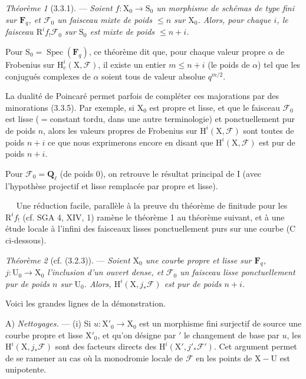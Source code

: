 \documentclass[11pt,leqno]{article}
\newcommand{\Page}[1]{\ifvmode\noindent\else\unskip\ \fi{\footnotesize\textcolor{gray}{[p.\,#1]}}\ \ignorespaces}
\begin{document}
\textit{Théorème 1} (3.3.1). — \textit{Soient \(f:\mathrm{X}_0\to\mathrm{S}_0\) un morphisme de schémas de type fini sur \(\mathbf{F}_q\), et \(\mathscr{F}_0\) un faisceau mixte de poids \(\leq n\) sur \(\mathrm{X}_0\). Alors, pour chaque \(i\), le faisceau \(\mathrm{R}^i f_!\mathscr{F}_0\) sur \(\mathrm{S}_0\) est mixte de poids \(\leq n+i\).}

Pour \(\mathrm{S}_0=\operatorname{Spec}(\mathbf{F}_q)\), ce théorème dit que, pour chaque valeur propre \(\alpha\) de Frobenius sur \(\mathrm{H}_c^i(\mathrm{X},\mathscr{F})\), il existe un entier \(m\leq n+i\) (le poids de \(\alpha\)) tel que les conjugués complexes de \(\alpha\) soient tous de valeur absolue \(q^{m/2}\).

La dualité de Poincaré permet parfois de compléter ces majorations par des minorations (3.3.5). Par exemple, si \(\mathrm{X}_0\) est propre et lisse, et que le faisceau \(\mathscr{F}_0\) est lisse (\(=\)constant tordu, dans une autre terminologie) et ponctuellement pur de poids \(n\), alors les valeurs propres de Frobenius sur \(\mathrm{H}^i(\mathrm{X},\mathscr{F})\) sont toutes de poids \(n+i\) ce que nous exprimerons encore en disant que \(\mathrm{H}^i(\mathrm{X},\mathscr{F})\) est pur de poids \(n+i\).

Pour \(\mathscr{F}_0=\mathbf{Q}_\ell\) (de poids 0), on retrouve le résultat principal de I (avec l’hypothèse projectif et lisse remplacée par propre et lisse).

\Page{139}
Une réduction facile, parallèle à la preuve du théorème de finitude pour les \(\mathrm{R}^i f_!\) (cf. SGA 4, XIV, 1) ramène le théorème 1 au théorème suivant, et à une étude locale à l’infini des faisceaux lisses ponctuellement purs sur une courbe (C ci-dessous).

\textit{Théorème 2} (cf. (3.2.3)). — \textit{Soient \(\mathrm{X}_0\) une courbe propre et lisse sur \(\mathbf{F}_q\), \(j:\mathrm{U}_0\to\mathrm{X}_0\) l’inclusion d’un ouvert dense, et \(\mathscr{F}_0\) un faisceau lisse ponctuellement pur de poids \(n\) sur \(\mathrm{U}_0\). Alors, \(\mathrm{H}^i(\mathrm{X},j_*\mathscr{F})\) est pur de poids \(n+i\).}

Voici les grandes lignes de la démonstration.

A) \textit{Nettoyages.} — (i) Si \(u:\mathrm{X}'_0\to\mathrm{X}_0\) est un morphisme fini surjectif de source une courbe propre et lisse \(\mathrm{X}'_0\), et qu’on désigne par \({}'\) le changement de base par \(u\), les \(\mathrm{H}^i(\mathrm{X},j_*\mathscr{F})\) sont des facteurs directs des \(\mathrm{H}^i(\mathrm{X}',j'_*\mathscr{F}')\). Cet argument permet de se ramener au cas où la monodromie locale de \(\mathscr{F}\) en les points de \(\mathrm{X}-\mathrm{U}\) est unipotente.
\end{document}
